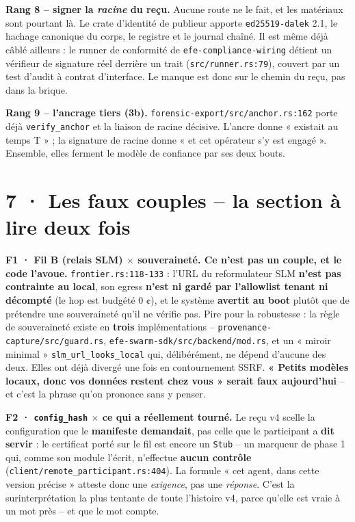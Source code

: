 \documentclass[10pt]{article}
\newcommand{\sz}[1]{{\small\color{grey}\textsf{#1}}}
\newcommand{\code}[1]{\texttt{\small #1}}
\newcommand{\x}{$\times$}
\begin{document}
\textbf{Rang 8 -- signer la \emph{racine} du reçu.} Aucune route ne le fait, et les matériaux sont
pourtant là. Le crate d'identité de publieur apporte \code{ed25519-dalek} 2.1, le hachage canonique du
corps, le registre et le journal chaîné. Il est même déjà câblé ailleurs : le runner de conformité de
\code{efe-compliance-wiring} détient un vérifieur de signature réel derrière un trait
\sz{(\code{src/runner.rs:79})}, couvert par un test d'audit à contrat d'interface. Le manque est donc
sur le chemin du reçu, pas dans la brique.

\textbf{Rang 9 -- l'ancrage tiers (3b).} \code{forensic-export/src/anchor.rs:162} porte déjà
\code{verify\_anchor} et la liaison de racine décisive. L'ancre donne « existait au temps T » ; la
signature de racine donne « et cet opérateur s'y est engagé ». Ensemble, elles ferment le modèle de
confiance par ses deux bouts.

\section{7 · Les faux couples -- la section à lire deux fois}

\begin{alerte}
\textbf{F1 · Fil B (relais SLM) \x{} souveraineté. Ce n'est pas un couple, et le code l'avoue.}
\code{frontier.rs:118-133} : l'URL du reformulateur SLM \textbf{n'est pas contrainte au local}, son
egress \textbf{n'est ni gardé par l'allowlist tenant ni décompté} (le hop est budgété 0 ¢), et le
système \textbf{avertit au boot} plutôt que de prétendre une souveraineté qu'il ne vérifie pas. Pire
pour la robustesse : la règle de souveraineté existe en \textbf{trois} implémentations --
\code{provenance-capture/src/guard.rs}, \code{efe-swarm-sdk/src/backend/mod.rs}, et un « miroir
minimal » \code{slm\_url\_looks\_local} qui, délibérément, ne dépend d'aucune des deux. Elles ont déjà
divergé une fois en contournement SSRF. \textbf{« Petits modèles locaux, donc vos données restent chez
vous » serait faux aujourd'hui} -- et c'est la phrase qu'on prononce sans y penser.
\end{alerte}

\textbf{F2 · \code{config\_hash} \x{} ce qui a réellement tourné.} Le reçu v4 scelle la configuration
que le \textbf{manifeste demandait}, pas celle que le participant a \textbf{dit servir} : le certificat
porté sur le fil est encore un \code{Stub} -- un marqueur de phase 1 qui, comme son module l'écrit,
n'effectue \textbf{aucun contrôle} \sz{(\code{client/remote\_participant.rs:404})}. La
formule « cet agent, dans cette version précise » atteste donc une \emph{exigence}, pas une
\emph{réponse}. C'est la surinterprétation la plus tentante de toute l'histoire v4, parce qu'elle est
vraie à un mot près -- et que le mot compte.
\end{document}
